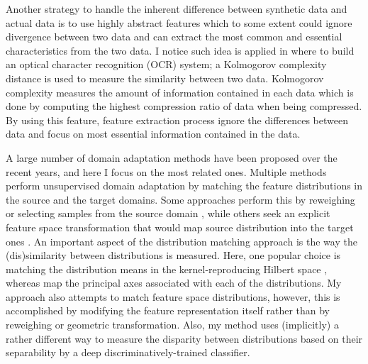 \documentclass{iitthesis}
\begin{document}
Another strategy to handle the inherent difference between synthetic data and actual data is to use highly abstract features which to some extent could ignore divergence between two data and can extract the most common and essential characteristics from the two data. I notice such idea is applied in \cite{Ulanova2014} where to build an optical character recognition (OCR) system; a Kolmogorov complexity distance is used to measure the similarity between two data. Kolmogorov complexity measures the amount of information contained in each data which is done by computing the highest compression ratio of data when being compressed. By using this feature, feature extraction process ignore the differences between data and focus on most essential information contained in the data.

A large number of domain adaptation methods have been proposed over the recent years, and here I focus on the most related ones. Multiple methods perform unsupervised domain adaptation by matching the feature distributions in the source and the target domains. Some approaches perform this by reweighing or selecting samples from the source domain \cite{borgwardt2006integrating} \cite{huang2006correcting} \cite{gong2013connecting}, while others seek an explicit feature space transformation that would map source distribution into the target ones \cite{pan2011domain} \cite{gopalan2011domain} \cite{baktashmotlagh2013unsupervised}. An important aspect of the distribution matching approach is the way the (dis)similarity between distributions is measured. Here, one popular choice is matching the distribution means in the kernel-reproducing Hilbert space \cite{borgwardt2006integrating} \cite{huang2006correcting}, whereas \cite{gong2012geodesic} \cite{fernando2013unsupervised} map the principal axes associated with each of the distributions. My approach also attempts to match feature space distributions, however, this is accomplished by modifying the feature representation itself rather than by reweighing or geometric transformation. Also, my method uses (implicitly) a rather different way to measure the disparity between distributions based on their separability by a deep discriminatively-trained classifier.
\end{document}
